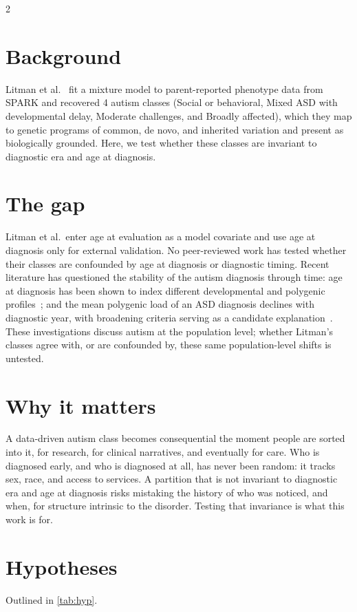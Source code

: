 \documentclass[11pt]{article}
\begin{document}
\begin{multicols}{2}
\section*{Background}

Litman et al.\ \cite{litmanDecompositionPhenotypicHeterogeneity2025a} fit a mixture model to
parent-reported phenotype data from SPARK and recovered 4 autism classes (Social or behavioral,
Mixed ASD with developmental delay, Moderate challenges, and Broadly affected), which they map to
genetic programs of common, de novo, and inherited variation and present as biologically
grounded. Here, we test whether these classes are invariant to diagnostic era and age at
diagnosis.

\section*{The gap}

Litman et al.\ enter age at evaluation as a model covariate and use age at diagnosis only for
external validation. No peer-reviewed work has tested whether their classes are confounded by
age at diagnosis or diagnostic timing. Recent literature has questioned the stability of the autism diagnosis through time: age at diagnosis has been shown to index different
developmental and polygenic profiles~\cite{zhangPolygenicDevelopmentalProfiles2025}; and the
mean polygenic load of an ASD diagnosis declines with diagnostic year, with broadening criteria
serving as a candidate explanation~\cite{labiancaChangesGeneticContributions2026}. These
investigations discuss autism at the population level; whether Litman's classes agree with, or
are confounded by, these same population-level shifts is untested.

\section*{Why it matters}

A data-driven autism class becomes consequential the moment people are sorted into it, for
research, for clinical narratives, and eventually for care. Who is diagnosed early, and who is
diagnosed at all, has never been random: it tracks sex, race, and access to services. A partition that is not invariant to diagnostic era and age at diagnosis risks mistaking the history of who was noticed, and when, for structure intrinsic to the disorder. Testing that invariance is what this work is for.

\section*{Hypotheses}

Outlined in \autoref{tab:hyp}.

\end{multicols}
\end{document}
